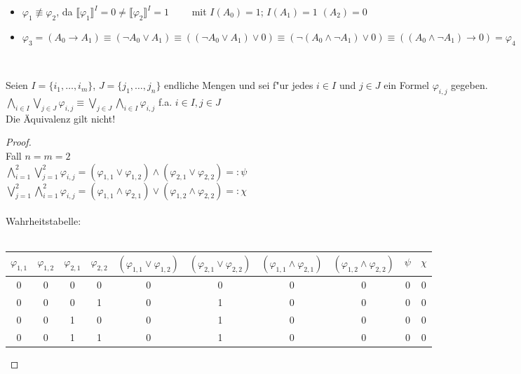 \documentclass[a4paper,10pt]{article}
\begin{document}
	\begin{compactenum} [(a)]
		\item
		\begin{itemize}
			\item $ \varphi_1 \not\equiv \varphi_2$, da $ \llbracket \varphi_1 \rrbracket ^I = 0 \neq \llbracket \varphi_2 \rrbracket ^I = 1 \qquad$ mit $ I(A_0) = 1 $; $ I(A_1) = 1 $ $ (A_2) = 0 $
			\item $ \varphi_3 = (A_0\rightarrow A_1) \equiv (\lnot A_0 \vee A_1) \equiv ((\lnot A_0 \vee A_1)\vee 0) \equiv (\lnot (A_0 \wedge \lnot A_1) \vee 0) \equiv ((A_0 \wedge \lnot A_1)\rightarrow 0) = \varphi_4$
		\end{itemize}\
		\item Seien $I = \{i_1, \dots , i_m\}$,  $J = \{j_1, \dots , j_n\} $ endliche Mengen und sei f"ur jedes $i \in I$ und $j \in J$ ein Formel $\varphi_{i, j}$ gegeben.\\
		$\bigwedge\limits_{i \in I} \bigvee\limits_{j \in J} \varphi_{i, j} \equiv \bigvee\limits_{j \in J} \bigwedge\limits_{i \in I} \varphi_{i, j}$ f.a. $i \in I, j\in J$\\
		Die Äquivalenz gilt nicht!
		\begin{proof}\ \\
			Fall $n = m = 2$\\
			$\bigwedge\limits_{i = 1}^2 \bigvee\limits_{j = 1}^2 \varphi_{i, j} = (\varphi_{1,1} \vee \varphi_{1,2}) \wedge (\varphi_{2,1} \vee \varphi_{2,2}) =: \psi$\\
		    $\bigvee\limits_{j = 1}^2 \bigwedge\limits_{i = 1}^2  \varphi_{i, j} = (\varphi_{1,1} \wedge \varphi_{2,1}) \vee (\varphi_{1,2} \wedge \varphi_{2,2}) =: \chi$\\\\
		    Wahrheitstabelle:\\ \\
		   \begin{tabular}{cccc|c|c|c|c|c|c}
		   	$\varphi_{1,1}$ & $\varphi_{1,2}$ & $\varphi_{2,1}$ & $\varphi_{2,2}$ & $(\varphi_{1,1} \vee \varphi_{1,2})$ & $(\varphi_{2,1} \vee \varphi_{2,2})$ & $(\varphi_{1,1} \wedge \varphi_{2,1})$ & $(\varphi_{1,2} \wedge \varphi_{2,2})$ & $\psi$ & $\chi$ \\ \hline
		   	0 & 0 & 0 & 0 & 0 & 0 & 0 & 0 & 0 & 0\\
		   	0 & 0 & 0 & 1 & 0 & 1 & 0 & 0 & 0 & 0\\
		   	0 & 0 & 1 & 0 & 0 & 1 & 0 & 0 & 0 & 0\\
		   	0 & 0 & 1 & 1 & 0 & 1 & 0 & 0 & 0 & 0\\

\end{tabular}
\end{proof}
\end{compactenum}
\end{document}
